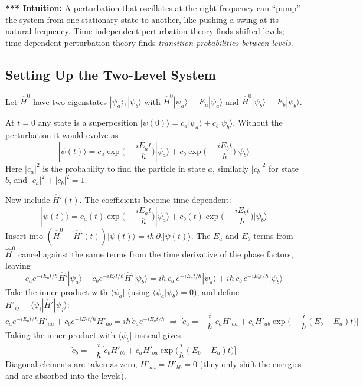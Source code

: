 \documentclass[11pt,a4paper]{article}
\begin{document}
\textbf{*** Intuition:} A perturbation that oscillates at the right frequency can ``pump'' the system from one stationary state to another, like pushing a swing at its natural frequency. Time-independent perturbation theory finds shifted levels; time-dependent perturbation theory finds \textit{transition probabilities between levels}.

\subsection{Setting Up the Two-Level System}
Let $\hat H^0$ have two eigenstates $|\psi_a\rangle,|\psi_b\rangle$ with $\hat H^0|\psi_a\rangle = E_a|\psi_a\rangle$ and $\hat H^0|\psi_b\rangle = E_b|\psi_b\rangle$.

\begin{center}
\end{center}

At $t=0$ any state is a superposition $|\psi(0)\rangle = c_a|\psi_a\rangle + c_b|\psi_b\rangle$. Without the perturbation it would evolve as
\[
|\psi(t)\rangle = c_a\exp\Big(-\frac{iE_at}{\hbar}\Big)|\psi_a\rangle + c_b\exp\Big(-\frac{iE_bt}{\hbar}\Big)|\psi_b\rangle
\]
Here $|c_a|^2$ is the probability to find the particle in state $a$, similarly $|c_b|^2$ for state $b$, and $|c_a|^2+|c_b|^2=1$.

Now include $\hat H'(t)$. The coefficients become time-dependent:
\[
|\psi(t)\rangle = c_a(t)\exp\Big(-\frac{iE_at}{\hbar}\Big)|\psi_a\rangle + c_b(t)\exp\Big(-\frac{iE_bt}{\hbar}\Big)|\psi_b\rangle
\]
Insert into $(\hat H^0+\hat H'(t))|\psi(t)\rangle = i\hbar\,\partial_t|\psi(t)\rangle$. The $E_a$ and $E_b$ terms from $\hat H^0$ cancel against the same terms from the time derivative of the phase factors, leaving
\[
c_a e^{-iE_at/\hbar}\hat H'|\psi_a\rangle + c_b e^{-iE_bt/\hbar}\hat H'|\psi_b\rangle = i\hbar\,\dot c_a\, e^{-iE_at/\hbar}|\psi_a\rangle + i\hbar\,\dot c_b\, e^{-iE_bt/\hbar}|\psi_b\rangle
\]
Take the inner product with $\langle\psi_a|$ (using $\langle\psi_a|\psi_b\rangle=0$), and define $H'_{ij}=\langle\psi_i|\hat H'|\psi_j\rangle$:
\[
c_a e^{-iE_at/\hbar}H'_{aa} + c_b e^{-iE_bt/\hbar}H'_{ab} = i\hbar\,\dot c_a e^{-iE_at/\hbar}
\;\Longrightarrow\;
\dot c_a = -\frac{i}{\hbar}\Big[c_aH'_{aa} + c_bH'_{ab}\exp\Big(-\frac{i}{\hbar}(E_b-E_a)t\Big)\Big]
\]
Taking the inner product with $\langle\psi_b|$ instead gives
\[
\dot c_b = -\frac{i}{\hbar}\Big[c_bH'_{bb} + c_aH'_{ba}\exp\Big(\frac{i}{\hbar}(E_b-E_a)t\Big)\Big]
\]
Diagonal elements are taken as zero, $H'_{aa}=H'_{bb}=0$ (they only shift the energies and are absorbed into the levels).
\end{document}
